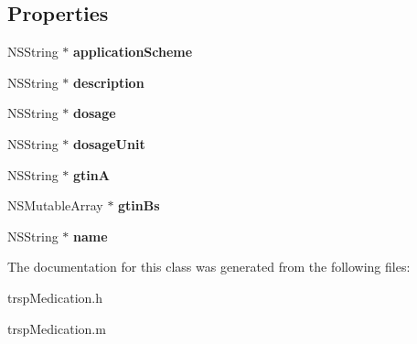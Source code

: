 \subsection*{Properties}
\begin{DoxyCompactItemize}
\item 
\hypertarget{interfacetrsp_medication_af3753473c2780203b4ae16902736c3ee}{}N\+S\+String $\ast$ {\bfseries application\+Scheme}\label{interfacetrsp_medication_af3753473c2780203b4ae16902736c3ee}

\item 
\hypertarget{interfacetrsp_medication_a408e2cfb7328f33ecbf9c0d22c5a52b2}{}N\+S\+String $\ast$ {\bfseries description}\label{interfacetrsp_medication_a408e2cfb7328f33ecbf9c0d22c5a52b2}

\item 
\hypertarget{interfacetrsp_medication_a13fdfdb4db2d277199d8c835f16b5942}{}N\+S\+String $\ast$ {\bfseries dosage}\label{interfacetrsp_medication_a13fdfdb4db2d277199d8c835f16b5942}

\item 
\hypertarget{interfacetrsp_medication_a2d20263d3392994bd065a2ea147282ea}{}N\+S\+String $\ast$ {\bfseries dosage\+Unit}\label{interfacetrsp_medication_a2d20263d3392994bd065a2ea147282ea}

\item 
\hypertarget{interfacetrsp_medication_a6ecb882dde9f2e701d616f4b450142b1}{}N\+S\+String $\ast$ {\bfseries gtin\+A}\label{interfacetrsp_medication_a6ecb882dde9f2e701d616f4b450142b1}

\item 
\hypertarget{interfacetrsp_medication_aa4c03a90b9c12dfbb858c99abff9da8e}{}N\+S\+Mutable\+Array $\ast$ {\bfseries gtin\+Bs}\label{interfacetrsp_medication_aa4c03a90b9c12dfbb858c99abff9da8e}

\item 
\hypertarget{interfacetrsp_medication_a25e9e5bec468b7135344377a81b52ec2}{}N\+S\+String $\ast$ {\bfseries name}\label{interfacetrsp_medication_a25e9e5bec468b7135344377a81b52ec2}

\end{DoxyCompactItemize}


The documentation for this class was generated from the following files\+:\begin{DoxyCompactItemize}
\item 
trsp\+Medication.\+h\item 
trsp\+Medication.\+m\end{DoxyCompactItemize}
